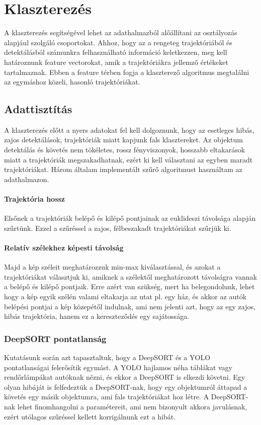 \documentclass[12pt,a4paper]{article}
\begin{document}
\newpage
\section{Klaszterezés}
A klaszterezés segítségével lehet az adathalmazból alőállítani az osztályozás alapjául szolgáló csoportokat. Ahhoz, hogy az
a rengeteg trajektóriából és detektálásból számunkra felhasználható információ keletkezzen, meg kell határoznunk feature
vectorokat, amik a trajektóriákra jellemző értékeket tartalmaznak. Ebben a feature térben fogja a klaszterező algoritmus
megtalálni az egymáshoz közeli, hasonló trajektóriákat.
\subsection{Adattisztítás}
A klaszterezés előtt a nyers adatokat fel kell dolgoznunk, hogy az esetleges hibás, zajos detektálások, trajektóriák miatt
kapjunk fals klasztereket. Az objektum detektálás és követés nem tökéletes, rossz fényviszonyok, hosszabb eltakarások miatt
a trajektóriák megszakadhatnak, ezért ki kell választani az egyben maradt trajektóriákat. Három általam implementált szűrő algoritmust használtam  
az adathalmazon. 
\paragraph{Trajektória hossz} Elsőnek a trajektóriák belépő és kilépő pontjainak az euklideszi távolsága alapján szűrtünk. Ezzel a szűréssel a zajos, félbeszakadt trajektóriákat szűrjük ki.
\paragraph{Relatív szélekhez képesti távolság} Majd a kép széleit meghatározzuk min-max kiválasztással, és azokat a trajektóriákat választjuk ki, amiknek a szélektől meghatározott
távolságra vannak a belépő és kilépő pontjaik. Erre azért van szükség, mert ha belegondolunk, lehet hogy a kép egyik szélén valami eltakarja az utat pl. egy ház, és akkor az autók belépési pontjai a kép közepétől indulnak, ami nem jelenti azt, hogy az egy zajos, hibás trajektória, hanem ez a kereszteződés egy sajátossága.
\subsubsection{DeepSORT pontatlanság}
Kutatásunk során azt tapasztaltuk, hogy a DeepSORT és a YOLO pontatlanságai felerősítik egymást. A YOLO hajlamos néha táblákat
vagy rendőrlámpákat autóknak nézni, és ekkor a DeepSORT is elkezdi követni. Egy olyan hibáját is felfedeztük a DeepSORT-nak, hogy
egy objektumról áttapad a követés egy másik objektumra, ami fals trajektóriákat hoz létre. A DeepSORT-nak lehet finomhangolni a
paramétereit, ami nem bizonyult akkora javulásnak, ezért utólagos szűréssel kellett korrigálnunk ezt a hibát. 
\end{document}
